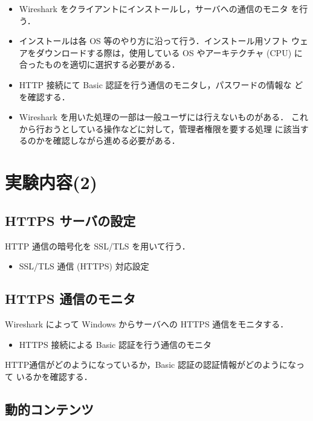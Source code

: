  \begin{itemize}
 \item Wireshark をクライアントにインストールし，サーバへの通信のモニタ
       を行う．
 \item インストールは各 OS 等のやり方に沿って行う．インストール用ソフト
       ウェアをダウンロードする際は，使用している OS やアーキテクチャ 
       (CPU) に合ったものを適切に選択する必要がある．
 \item HTTP 接続にて Basic 認証を行う通信のモニタし，パスワードの情報な
       どを確認する．
 \item Wireshark を用いた処理の一部は一般ユーザには行えないものがある．
       これから行おうとしている操作などに対して，管理者権限を要する処理
       に該当するのかを確認しながら進める必要がある．
 \end{itemize}


\section{実験内容(2)}

\subsection{HTTPS サーバの設定}

HTTP 通信の暗号化を SSL/TLS を用いて行う．

\begin{itemize}
\item SSL/TLS 通信 (HTTPS) 対応設定
\end{itemize}

\subsection{HTTPS 通信のモニタ}

Wireshark によって Windows からサーバへの HTTPS 通信をモニタする．
\begin{itemize}
 \item HTTPS 接続による Basic 認証を行う通信のモニタ
\end{itemize}

HTTP通信がどのようになっているか，Basic 認証の認証情報がどのようになって
いるかを確認する．

\subsection{動的コンテンツ}

